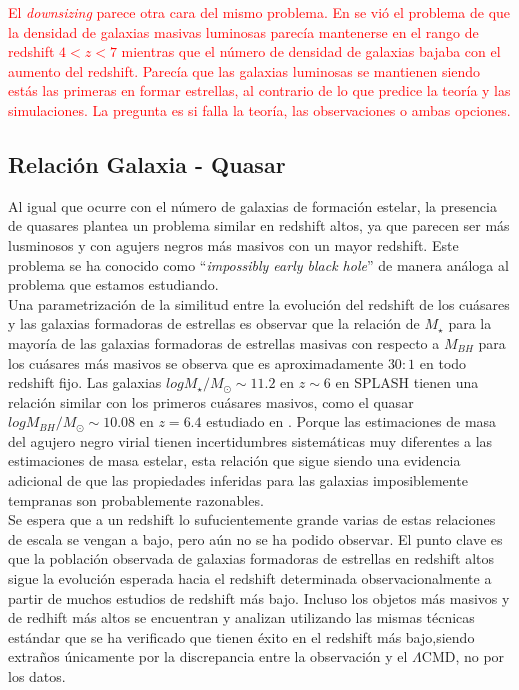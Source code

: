 \documentclass{article}
\begin{document}
\textcolor{red}{El \textit{downsizing} parece otra cara del mismo problema. En \citep{arranz2015finkelstein} se vió el problema de que la densidad de galaxias masivas luminosas parecía mantenerse en el rango de redshift $4<z<7$ mientras que el número de densidad de galaxias bajaba con el aumento del redshift. Parecía que las galaxias luminosas se mantienen siendo estás las primeras en formar estrellas, al contrario de lo que predice la teoría y las simulaciones. La pregunta es si falla la teoría, las observaciones o ambas opciones.}

\subsection{Relación Galaxia - Quasar}

Al igual que ocurre con el número de galaxias de formación estelar, la presencia de quasares plantea un problema similar en redshift altos, ya que parecen ser más lusminosos y con agujers negros más masivos con un mayor redshift. Este problema se ha conocido como ``\textit{impossibly early black hole}'' de manera análoga al problema que estamos estudiando.\\

Una parametrización de la similitud entre la evolución del redshift de los cuásares y las galaxias formadoras de estrellas es observar que la relación de $M_\star$ para la mayoría de las galaxias formadoras de estrellas masivas con respecto a $M_{BH}$ para los cuásares más masivos se observa que es aproximadamente $30:1$ en todo redshift fijo. Las galaxias $log M_\star / M_\odot\sim11.2$ en $z\sim 6$ en SPLASH tienen una relación similar con los primeros cuásares masivos, como el quasar $log M_{BH} / M_\odot\sim 10.08$  en $z = 6.4$ estudiado en \cite{wu2015ultraluminous}. Porque las estimaciones de masa del agujero negro virial tienen incertidumbres sistemáticas muy diferentes a las estimaciones de masa estelar, esta relación que sigue siendo una evidencia adicional de que las propiedades inferidas para las galaxias imposiblemente tempranas son probablemente razonables.\\

Se espera que a un redshift lo sufucientemente grande varias de estas relaciones de escala se vengan a bajo, pero aún no se ha podido observar. El punto clave es que la población observada de galaxias formadoras de estrellas  en redshift altos  sigue la evolución esperada hacia el redshift determinada observacionalmente a partir de muchos estudios de redshift más bajo. Incluso los objetos más masivos y de redhift más altos se encuentran y analizan utilizando las mismas técnicas estándar que se ha verificado que tienen éxito en el redshift más bajo,siendo extraños únicamente por la discrepancia entre la observación y el $\Lambda$CMD, no por los datos.\\
\end{document}
